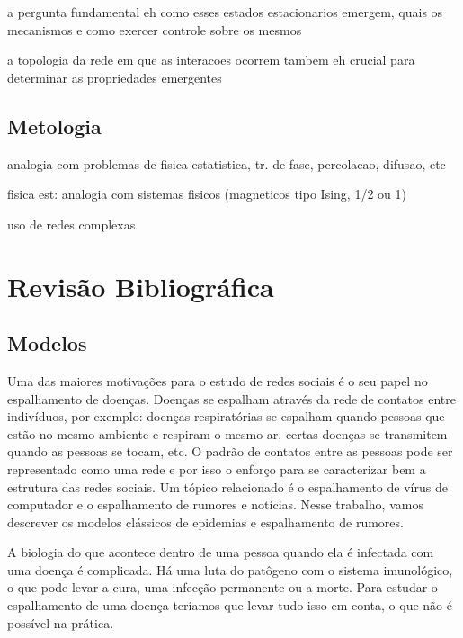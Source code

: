 \documentclass[a4paper,11pt]{report}
\begin{document}
a pergunta fundamental eh como esses estados estacionarios emergem, 
quais os mecanismos e como exercer controle sobre os mesmos


a topologia da rede em que as interacoes ocorrem tambem eh 
crucial para determinar as propriedades emergentes 

\section{Metologia} 

analogia com problemas de fisica estatistica, tr. de fase, percolacao, difusao, etc

fisica est: analogia com sistemas fisicos (magneticos tipo Ising, 1/2 ou 1)

uso de redes complexas

\chapter{Revis\~ao Bibliogr\'afica}
\label{chap:models}

\section{Modelos}

Uma das maiores motiva\c{c}\~oes para o estudo de redes sociais \'e o seu papel no espalhamento de doen\c{c}as. Doen\c{c}as se espalham atrav\'es da rede de contatos entre indiv\'iduos, por exemplo: doen\c{c}as respirat\'orias se espalham quando pessoas que est\~ao no mesmo ambiente e respiram o mesmo ar, certas doen\c{c}as se transmitem quando as pessoas se tocam, etc. O padr\~ao de contatos entre as pessoas pode ser representado como uma rede e por isso o enfor\c{c}o para se caracterizar bem a estrutura das redes sociais. Um t\'opico relacionado \'e o espalhamento de v\'irus de computador e o espalhamento de rumores e not\'icias.    
Nesse trabalho, vamos descrever os modelos cl\'assicos de epidemias e espalhamento de rumores. 

A biologia do que acontece dentro de uma pessoa quando ela \'e infectada com uma doen\c{c}a \'e complicada. H\'a uma luta do pat\^ogeno com o sistema imunol\'ogico, o que pode levar a cura, uma infec\c{c}\~ao permanente ou a morte. Para estudar o espalhamento de uma doen\c{c}a ter\'iamos que levar tudo isso em conta, o que n\~ao \'e poss\'ivel na pr\'atica. 
\end{document}
